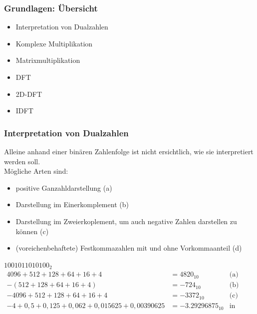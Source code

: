 \begin{frame}\frametitle{Grundlagen: Übersicht}


 \begin{itemize}
  \item Interpretation von Dualzahlen
  \item Komplexe Multiplikation
  \item Matrixmultiplikation
  \item DFT
  \item 2D-DFT
  \item IDFT
 \end{itemize}
\end{frame}

\begin{frame}\frametitle{Interpretation von Dualzahlen}
 Alleine anhand einer binären Zahlenfolge ist nicht ersichtlich, wie sie interpretiert werden soll.\\
 \medskip
 Mögliche Arten sind:
 \begin{itemize}
  \item positive Ganzahldarstellung (a)
  \item Darstellung im Einerkomplement (b)
  \item Darstellung im Zweierkoplement, um auch negative Zahlen darstellen zu können (c)
  \item (voreichenbehaftete) Festkommazahlen mit und ohne Vorkommaanteil (d)
 \end{itemize}

 

\medskip
\hspace{1cm}$1001011010100_2$
 \begin{align*}
    4096+512+128+64+16+4 &=  4820_{10}   &\textrm{(a)}\\
    - (512+128+64+16+4) & = -724_{10}   &\textrm{(b)}\\
   -4096+512+128+64+16+4 &= -3372_{10}   &\textrm{(c)}\\
   -4+0,5+0,125+0,062+0,015625+0,00390625 &= -3.29296875_{10} &\textrm{in S2Q10 (d)}
 \end{align*} 
 
\end{frame}

